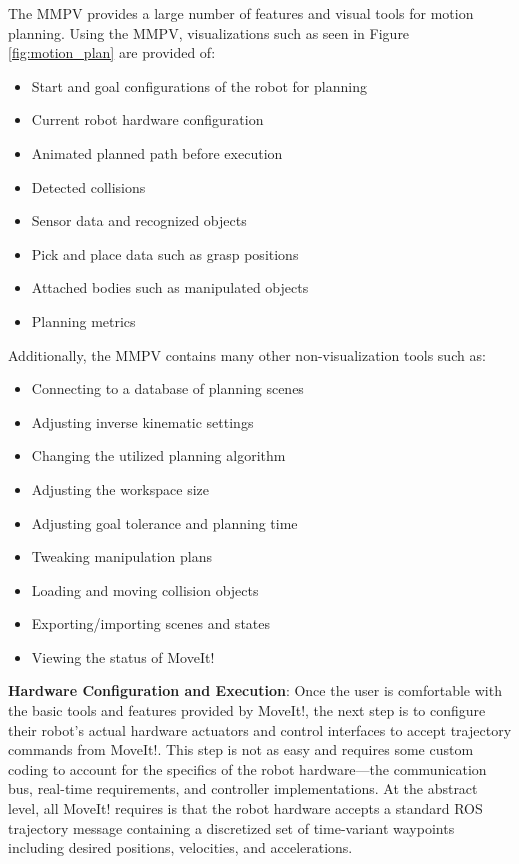 \documentclass[10pt,journal,compsoc]{joser1}
\begin{document}
{The MMPV provides a large number of features and visual tools for motion
planning. Using the MMPV, visualizations such as seen in Figure
\ref{fig:motion_plan} are provided of:

\begin{itemize}
    \item Start and goal configurations of the robot for planning
    \item Current robot hardware configuration
    \item Animated planned path before execution
    \item Detected collisions
    \item Sensor data and recognized objects
    \item Pick and place data such as grasp positions
    \item Attached bodies such as manipulated objects
    \item Planning metrics
\end{itemize}

Additionally, the MMPV contains many other non-visualization tools such as:
\begin{itemize}
    \item Connecting to a database of planning scenes
    \item Adjusting inverse kinematic settings
    \item Changing the utilized planning algorithm
    \item Adjusting the workspace size
    \item Adjusting goal tolerance and planning time
    \item Tweaking manipulation plans
    \item Loading and moving collision objects
    \item Exporting/importing scenes and states
    \item Viewing the status of MoveIt!
\end{itemize}

{\bf Hardware Configuration and Execution}: Once the user is comfortable with
the basic tools and features provided by MoveIt!, the next step is to configure
their robot's actual hardware actuators and control interfaces to accept
trajectory commands from MoveIt!. This step is not as easy and requires some
custom coding to account for the specifics of the robot hardware---the
communication bus, real-time requirements, and controller implementations. At
the abstract level, all MoveIt! requires is that the robot hardware accepts a
standard ROS trajectory message containing a discretized set of time-variant
waypoints including desired positions, velocities, and accelerations.  

}
\end{document}

